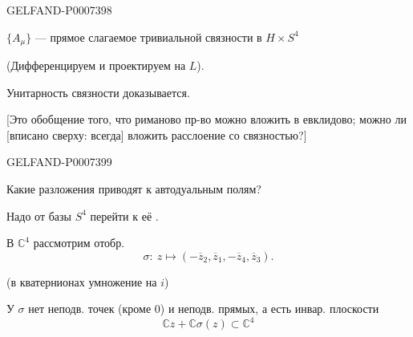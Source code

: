 \begin{GelfandAdjacentEvidence}{GELFAND-P000739}{8}


\(\{A_\mu\}\) --- прямое слагаемое тривиальной связности в \(H\times S^4\)

(Дифференцируем и проектируем на \(L\)).

Унитарность связности доказывается.

[Это обобщение того, что риманово пр-во можно вложить в евклидово; можно ли [вписано сверху: всегда] вложить расслоение со связностью?]
\end{GelfandAdjacentEvidence}
\begin{GelfandAdjacentEvidence}{GELFAND-P000739}{9}


Какие разложения приводят к автодуальным полям?

Надо от базы \(S^4\) перейти к её .

В \(\mathbb C^4\) рассмотрим отобр.
\[
\sigma:\ z\mapsto(-\overline z_2,\overline z_1,-\overline z_4,\overline z_3).
\]
\end{GelfandAdjacentEvidence}

(в кватернионах умножение на \(i\))

У \(\sigma\) нет неподв. точек (\(\text{кроме }0\)) и неподв. прямых, а есть инвар. плоскости
\begin{equation*}
\tag*{(5)\hfill}
\mathbb C z+\mathbb C\sigma(z)\subset\mathbb C^4
\end{equation*}


